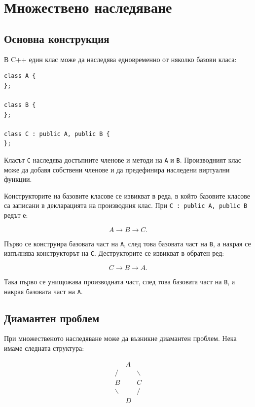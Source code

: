 \section{Множествено наследяване}\label{s:17.6}

\subsection{Основна конструкция}\label{s:17.6.1}

В C++ един клас може да наследява едновременно от няколко базови класа:

\begin{verbatim}
class A {
};

class B {
};

class C : public A, public B {
};
\end{verbatim}

Класът \texttt{C} наследява достъпните членове и методи на \texttt{A} и \texttt{B}. Производният клас може да добавя собствени членове и да предефинира наследени виртуални функции.

Конструкторите на базовите класове се извикват в реда, в който базовите класове са записани в декларацията на производния клас. При \texttt{C : public A, public B} редът е:

\[
A \longrightarrow B \longrightarrow C.
\]

Първо се конструира базовата част на \texttt{A}, след това базовата част на \texttt{B}, а накрая се изпълнява конструкторът на \texttt{C}. Деструкторите се извикват в обратен ред:

\[
C \longrightarrow B \longrightarrow A.
\]

Така първо се унищожава производната част, след това базовата част на \texttt{B}, а накрая базовата част на \texttt{A}.

\subsection{Диамантен проблем}\label{s:17.6.2}

При множественото наследяване може да възникне диамантен проблем. Нека имаме следната структура:

\[
\begin{array}{ccc}
 & A & \\
 / & & \backslash \\
B & & C \\
 \backslash & & / \\
 & D &
\end{array}
\]

